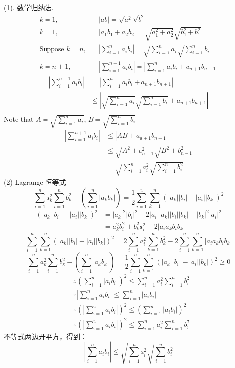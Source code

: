 (1). 数学归纳法.\\
\begin{align*}
	k=1,\quad& |ab|=\sqrt{a^2}\sqrt{b^2}\\
	k=1,\quad& |a_1b_1+a_2b_2|=\sqrt{a_1^2+a_2^2}\sqrt{b_1^2+b_1^2}\\
	\text{Suppose }k=n,\quad&|\sum_{i=1}^n a_ib_i|=\sqrt{\sum_{i=1}^n a_i}\sqrt{\sum_{i=1}^n b_i}\\
	k=n+1,\quad&|\sum_{i=1}^{n+1} a_ib_i|=|\sum_{i=1}^{n} a_ib_i + a_{n+1}b_{n+1}|
\end{align*}
\begin{align*}
	|\sum_{i=1}^{n+1} a_ib_i|
	&=|\sum_{i=1}^{n} a_ib_i + a_{n+1}b_{n+1}|\\
	&\le|\sqrt{\sum_{i=1}^n a_i}\sqrt{\sum_{i=1}^n b_i} + a_{n+1}b_{n+1}|\\
\end{align*}
Note that $ A = \sqrt{\sum_{i=1}^n a_i} $, $ B = \sqrt{\sum_{i=1}^n b_i} $
\begin{align*}
	|\sum_{i=1}^{n+1} a_ib_i|
	&\le|AB+a_{n+1}b_{n+1}|\\
	&\le\sqrt{A^2+a_{n+1}^2}\sqrt{B^2+b_{n+1}^2}\\
	&=\sqrt{\sum_{i=1}^na_i^2}\sqrt{\sum_{i=1}^nb_i^2}
\end{align*}
(2) Lagrange 恒等式
\begin{equation}
	\sum_{i=1}^n a_k^2\sum_{i=1}^n b_k^2 - (\sum_{i=1}^n |a_kb_k|) = \frac{1}{2}\sum_{i=1}^n\sum_{k=1}^n(|a_k||b_i|-|a_i||b_k|)^2
\end{equation}
\begin{align*}
	(|a_k||b_i|-|a_i||b_k|)^2 
	&= |a_k|^2|b_i|^2-2|a_i||a_k||b_i||b_k|+|b_k|^2|a_i|^2\\
	&= a_k^2b_i^2+b_k^2a_i^2-2|a_ia_kb_ib_k|
\end{align*}
\begin{equation*}
	\sum_{i=1}^n\sum_{k=1}^n(|a_k||b_i|-|a_i||b_k|)^2 = 2\sum_{i=1}^n a_i^2 \sum_{k=1}^n b_k^2 - 2\sum_{i=1}^n\sum_{k=1}^n|a_ia_kb_ib_k|
\end{equation*}
\begin{equation*}
	\sum_{i=1}^n a_k^2\sum_{i=1}^n b_k^2 - (\sum_{i=1}^n |a_kb_k|) = \frac{1}{2}\sum_{i=1}^n\sum_{k=1}^n(|a_k||b_i|-|a_i||b_k|)^2 \ge 0
\end{equation*}
\begin{align*}
	&\therefore (\sum_{i=1}^n|a_ib_i|)^2 \leqslant \sum_{i=1}^na_i^2 \sum_{i=1}^nb_i^2\\
	&\because |\sum_{i=1}^n a_i b_i| \leqslant \sum_{i=1}^n|a_ib_i|\\
	&\therefore (|\sum_{i=1}^n a_i b_i|)^2 \leqslant (\sum_{i=1}^n|a_ib_i|)^2\\
	&\therefore (|\sum_{i=1}^n a_i b_i|)^2 \leqslant \sum_{i=1}^n a_i^2 \sum_{i=1}^n b_i^2
\end{align*}
不等式两边开平方，得到：
\begin{equation*}
	|\sum_{i=1}^n a_i b_i| \leqslant \sqrt{\sum_{i=1}^n a_i^2} \sqrt{\sum_{i=1}^n b_i^2}
\end{equation*}

